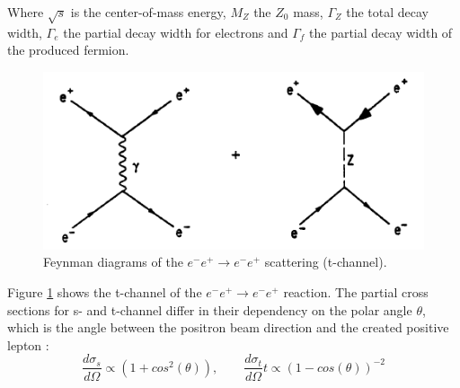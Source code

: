 Where $\sqrt{s}$ is the center-of-mass energy, $M_Z$ the $Z_0$ mass, $\Gamma_Z$ the total decay width, $\Gamma_e$ the partial decay width for electrons and $\Gamma_f$ the partial decay width of the produced fermion.
\begin{figure}[H]
	\centering
	\includegraphics{graphics/BhabbaStreuung.png}
	\caption[Feynman diagram: Bhabha scattering]{Feynman diagrams of the $e^-e^+ \rightarrow e^-e^+$ scattering (t-channel). \cite{muenchen}}
	\label{fig:principles:BhabbaStreuung.png}
\end{figure}
Figure \ref{fig:principles:BhabbaStreuung.png} shows the t-channel of the  $e^-e^+ \rightarrow e^-e^+$ reaction. The partial cross sections for s- and t-channel differ in their dependency on the polar angle $\theta$, which is the angle between the positron beam direction and the created positive lepton \cite{staatsex}:
\begin{equation}
\frac{d\sigma_s}{d\Omega} \propto (1+cos^2(\theta)),\qquad\frac{d\sigma_t}{d\Omega}t \propto (1-cos(\theta))^{-2}
\label{eq:principles:s-t-channel}
\end{equation}
